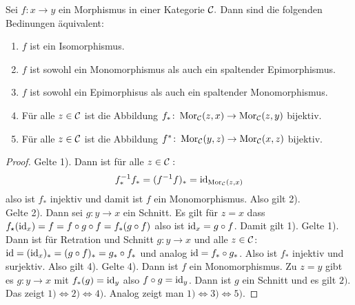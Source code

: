 \begin{Lemma}
    Sei $f\colon x\to y$ ein Morphismus in einer Kategorie $\mathcal{C}.$ Dann sind die folgenden Bedinungen äquivalent:
    \begin{enumerate}
        \item $f$ ist ein Isomorphismus.
        \item $f$ ist sowohl ein Monomorphismus als auch ein spaltender Epimorphismus.
        \item $f$ ist sowohl ein Epimorphisus als auch ein spaltender Monomorphismus.
         
        \item Für alle $z\in\mathcal{C}$ ist die Abbildung $f_*\colon\operatorname{Mor}_{\mathcal{C}}(z,x)\to\operatorname{Mor}_{\mathcal{C}}(z,y)$ bijektiv.
        \item Für alle $z\in\mathcal{C}$ ist die Abbildung $f^*\colon \operatorname{Mor}_{\mathcal{C}}(y,z)\to \operatorname{Mor}_{\mathcal{C}}(x,z)$ bijektiv.
       
    \end{enumerate}
\end{Lemma}
\begin{proof}
    Gelte 1). Dann ist für alle $z\in\mathcal{C}:$ $$f^{-1}_*f_*=(f^{-1}f)_*=\mathrm{id}_{\operatorname{Mor}_{\mathcal{C}}(z,x)}$$ also ist $f_*$ injektiv und damit ist $f$ ein Monomorphismus. Also gilt 2).\\
    Gelte 2). Dann sei $g\colon y\to x$ ein Schnitt.
    Es gilt für $z=x$ dass $f_\star (\mathrm{id}_x)=f=f\circ g\circ f=f_*(g\circ f)$ also ist $\mathrm{id}_x=g\circ f$. Damit gilt 1).
    Gelte 1). Dann ist für Retration und Schnitt $g\colon y\to x$ und alle $z\in\mathcal{C}$:
    $\mathrm{id}=(\mathrm{id}_x)_*=(g\circ f)_*=g_*\circ f_*$ und analog
    $\mathrm{id}=f_*\circ g_*$. Also ist $f_*$ injektiv und surjektiv. Also gilt 4).
    Gelte 4). Dann ist $f$ ein Monomorphismus. Zu $z=y$ gibt es $g\colon y\to x$ mit $f_*(g)=\mathrm{id}_y$ also $f\circ g=\mathrm{id}_y$. Dann ist $g$ ein Schnitt und es gilt $2).$
    Das zeigt $1)\iff 2)\iff 4)$. Analog zeigt man $1)\iff 3)\iff 5).$
\end{proof}
